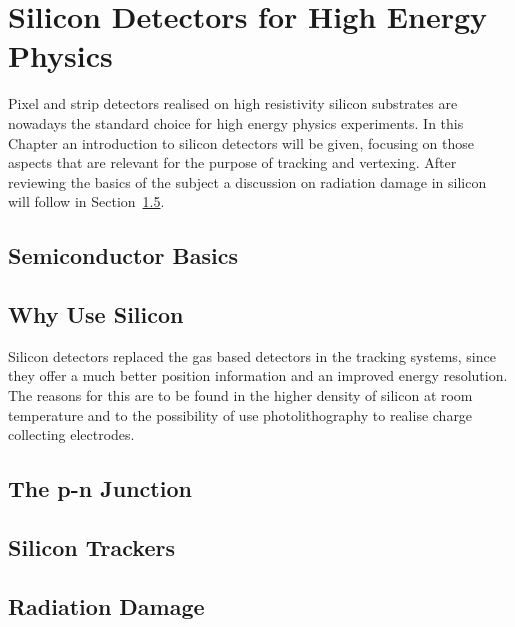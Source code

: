 \chapter{Silicon Detectors for High Energy Physics}
\label{chap:silicon}

Pixel and strip detectors realised on high resistivity silicon substrates are nowadays the standard 
choice for high energy physics experiments. 
In this Chapter an introduction to silicon detectors will be given, focusing 
on those aspects that are relevant for the purpose of tracking and vertexing. After reviewing the basics of the subject a discussion on radiation damage in silicon 
will follow in Section~\ref{sec:RadDam}.
\section{Semiconductor Basics}

\section{Why Use Silicon}

Silicon detectors replaced the  gas based detectors in the tracking systems, since they offer a much
 better position information and an improved energy resolution. The reasons for this are to be found 
in the higher density of silicon at room temperature and to the possibility of use photolithography 
to realise charge collecting electrodes. 


\section{The p-n Junction}
\section{Silicon Trackers}
\section{Radiation Damage}
\label{sec:RadDam}
